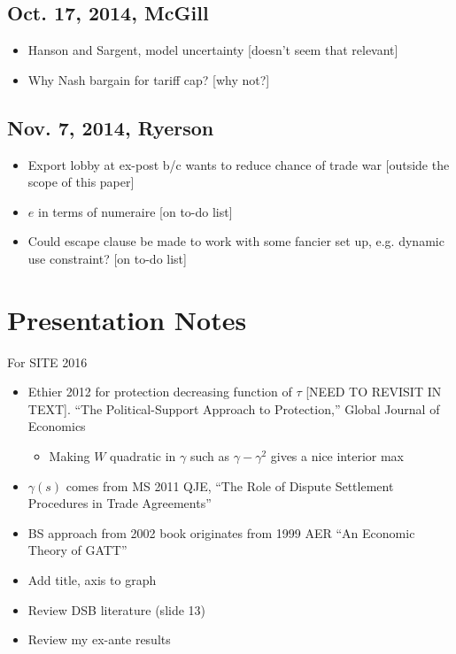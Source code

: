 \documentclass[12pt]{article}
\newcommand{\ga}{\gamma}
\begin{document}
\subsection{Oct. 17, 2014, McGill}
\begin{itemize}
	\item Hanson and Sargent, model uncertainty [doesn't seem that relevant]
	\item Why Nash bargain for tariff cap? [why not?]
\end{itemize}

\subsection{Nov. 7, 2014, Ryerson}
\begin{itemize}
	\item Export lobby at ex-post b/c wants to reduce chance of trade war [outside the scope of this paper]
	\item $e$ in terms of numeraire [on to-do list]
	\item Could escape clause be made to work with some fancier set up, e.g. dynamic use constraint? [on to-do list]
\end{itemize}


\newpage
\section{Presentation Notes}
For SITE 2016
\begin{itemize}
	\item Ethier 2012 for protection decreasing function of $\tau$ [NEED TO REVISIT IN TEXT]. ``The Political-Support Approach to Protection,'' Global Journal of Economics
		\begin{itemize}
			\item Making $W$ quadratic in $\ga$ such as $\ga - \ga^2$ gives a nice interior max
		\end{itemize}
	\item $\ga(s)$ comes from MS 2011 QJE, ``The Role of Dispute Settlement Procedures in Trade Agreements''
	\item BS approach from 2002 book originates from 1999 AER ``An Economic Theory of GATT''
	\item Add title, axis to graph
	\item Review DSB literature (slide 13)
	\item Review my ex-ante results
\end{itemize}
\end{document}
